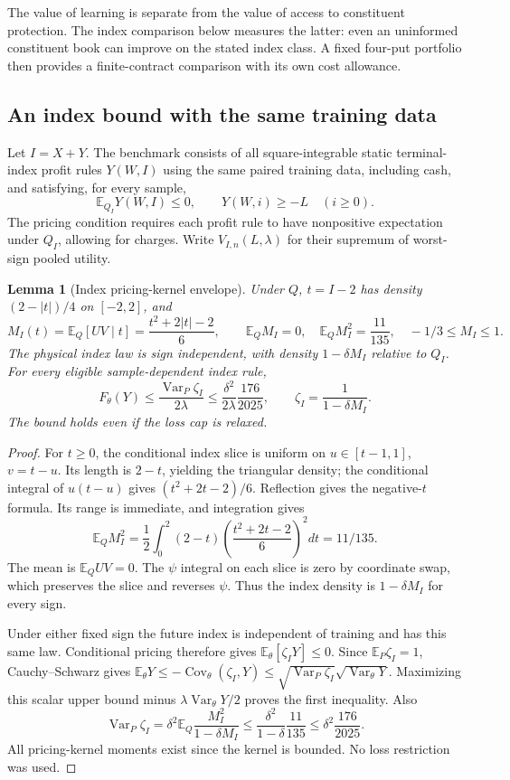\documentclass[11pt,a4paper]{amsart}
\theoremstyle{plain}
\newtheorem{lemma}[theorem]{Lemma}
\theoremstyle{definition}
\theoremstyle{remark}
\DeclareMathOperator{\Var}{Var}
\DeclareMathOperator{\Cov}{Cov}
\newcommand{\EE}{\mathbb{E}}
\begin{document}
The value of learning is separate from the value of access to constituent protection. The index comparison below measures the latter: even an uninformed constituent book can improve on the stated index class. A fixed four-put portfolio then provides a finite-contract comparison with its own cost allowance.

\subsection{An index bound with the same training data}
Let $I=X+Y$. The benchmark consists of all square-integrable static terminal-index profit rules $Y(W,I)$ using the same paired training data, including cash, and satisfying, for every sample,
\[
 \EE_{Q_I}Y(W,I)\le0,\qquad Y(W,i)\ge-L\quad(i\ge0).
\]
The pricing condition requires each profit rule to have nonpositive expectation under $Q_I$, allowing for charges. Write $V_{I,n}(L,\lambda)$ for their supremum of worst-sign pooled utility.

\begin{lemma}[Index pricing-kernel envelope]\label{lem:index}
Under $Q$, $t=I-2$ has density $(2-|t|)/4$ on $[-2,2]$, and
\begin{equation}\label{eq:indexmoments}
 M_I(t)=\EE_Q[UV\mid t]=\frac{t^2+2|t|-2}{6},\qquad
 \EE_Q M_I=0,\quad \EE_QM_I^2=\frac{11}{135},\quad -1/3\le M_I\le1.
\end{equation}
The physical index law is sign independent, with density $1-\delta M_I$ relative to $Q_I$. For every eligible sample-dependent index rule,
\begin{equation}\label{eq:indexenvelope}
 F_\theta(Y)\le\frac{\Var_P\zeta_I}{2\lambda}
 \le\frac{\delta^2}{2\lambda}\frac{176}{2025},\qquad
 \zeta_I=\frac1{1-\delta M_I}.
\end{equation}
The bound holds even if the loss cap is relaxed.
\end{lemma}
\begin{proof}
For $t\ge0$, the conditional index slice is uniform on $u\in[t-1,1]$, $v=t-u$. Its length is $2-t$, yielding the triangular density; the conditional integral of $u(t-u)$ gives $(t^2+2t-2)/6$. Reflection gives the negative-$t$ formula. Its range is immediate, and integration gives
\[
 \EE_QM_I^2=\frac12\int_0^2(2-t)
             \left(\frac{t^2+2t-2}{6}\right)^2dt=11/135.
\]
The mean is $\EE_QUV=0$. The $\psi$ integral on each slice is zero by coordinate swap, which preserves the slice and reverses $\psi$. Thus the index density is $1-\delta M_I$ for every sign.

Under either fixed sign the future index is independent of training and has this same law. Conditional pricing therefore gives $\EE_\theta[\zeta_IY]\le0$. Since $\EE_P\zeta_I=1$, Cauchy--Schwarz gives
$\EE_\theta Y\le-\Cov_\theta(\zeta_I,Y)
\le\sqrt{\Var_P\zeta_I}\sqrt{\Var_\theta Y}$.
Maximizing this scalar upper bound minus $\lambda\Var_\theta Y/2$ proves the first inequality. Also
\[
 \Var_P\zeta_I
 =\delta^2\EE_Q\frac{M_I^2}{1-\delta M_I}
 \le\frac{\delta^2}{1-\delta}\frac{11}{135}
 \le\delta^2\frac{176}{2025}.
\]
All pricing-kernel moments exist since the kernel is bounded. No loss restriction was used.
\end{proof}
\end{document}
